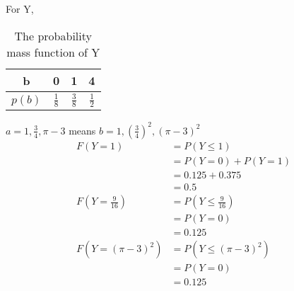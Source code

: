 \documentclass[11pt]{article} %
\begin{document}
For Y, 
\begin{table}[h!]
\begin{center}
\begin{tabular}{c|ccc} \hline
b & 0 & 1 & 4 \\ \hline
$p(b)$ & $\frac{1}{8}$ & $\frac{3}{8}$ & $\frac{1}{2}$ \\ \hline
\end{tabular}
\caption{The probability mass function of Y}
\label{ta1}
\end{center}
\end{table}
$a=1, \frac{3}{4}, \pi-3$ means $b = 1, (\frac{3}{4})^2, (\pi - 3)^2$
\begin{align*}
F(Y=1) & = P(Y\leq 1) \\
& = P(Y=0) + P(Y=1) \\
& = 0.125 + 0.375 \\
& = 0.5 \\
F(Y=\frac{9}{16}) & = P(Y\leq \frac{9}{16}) \\
&=  P(Y=0) \\
& = 0.125  \\
F(Y=(\pi -3)^2) & = P(Y\leq (\pi -3)^2) \\
&= P(Y=0)  \\
& =  0.125 \\
\end{align*}
\end{document}
